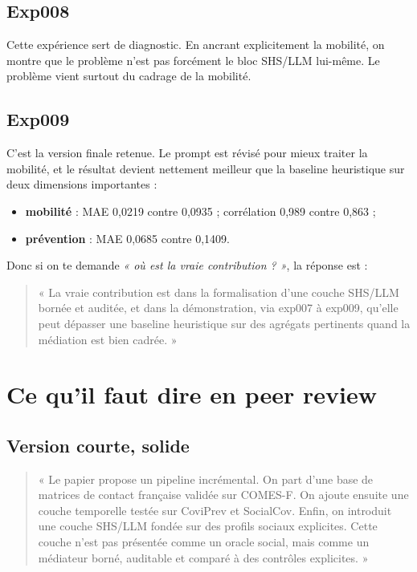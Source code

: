 \documentclass[11pt,a4paper]{article}
\begin{document}
\subsection*{Exp008}
Cette expérience sert de diagnostic. En ancrant explicitement la mobilité, on montre que le problème n'est pas forcément le bloc SHS/LLM lui-même. Le problème vient surtout du cadrage de la mobilité.

\subsection*{Exp009}
C'est la version finale retenue. Le prompt est révisé pour mieux traiter la mobilité, et le résultat devient nettement meilleur que la baseline heuristique sur deux dimensions importantes :
\begin{itemize}
\item \textbf{mobilité} : MAE 0,0219 contre 0,0935 ; corrélation 0,989 contre 0,863 ;
\item \textbf{prévention} : MAE 0,0685 contre 0,1409.
\end{itemize}

Donc si on te demande \emph{« où est la vraie contribution ? »}, la réponse est :
\begin{quote}
« La vraie contribution est dans la formalisation d'une couche SHS/LLM bornée et auditée, et dans la démonstration, via exp007 à exp009, qu'elle peut dépasser une baseline heuristique sur des agrégats pertinents quand la médiation est bien cadrée. »
\end{quote}

\section{Ce qu'il faut dire en peer review}

\subsection*{Version courte, solide}
\begin{quote}
« Le papier propose un pipeline incrémental. On part d'une base de matrices de contact française validée sur COMES-F. On ajoute ensuite une couche temporelle testée sur CoviPrev et SocialCov. Enfin, on introduit une couche SHS/LLM fondée sur des profils sociaux explicites. Cette couche n'est pas présentée comme un oracle social, mais comme un médiateur borné, auditable et comparé à des contrôles explicites. »
\end{quote}
\end{document}
